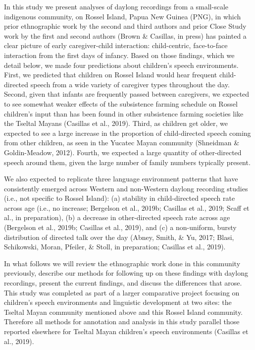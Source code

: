 \documentclass[,man,floatsintext]{apa6}
\begin{document}
In this study we present analyses of daylong recordings from a
small-scale indigenous community, on Rossel Island, Papua New Guinea
(PNG), in which prior ethnographic work by the second and third authors
and prior Close Study work by the first and second authors (Brown \&
Casillas, in press) has painted a clear picture of early caregiver-child
interaction: child-centric, face-to-face interaction from the first days
of infancy. Based on those findings, which we detail below, we made four
predictions about children's speech environments. First, we predicted
that children on Rossel Island would hear frequent child-directed speech
from a wide variety of caregiver types throughout the day. Second, given
that infants are frequently passed between caregivers, we expected to
see somewhat weaker effects of the subsistence farming schedule on
Rossel children's input than has been found in other subsistence farming
societies like the Tseltal Mayans (Casillas et al., 2019). Third, as
children get older, we expected to see a large increase in the
proportion of child-directed speech coming from other children, as seen
in the Yucatec Mayan community (Shneidman \& Goldin-Meadow, 2012).
Fourth, we expected a large quantity of other-directed speech around
them, given the large number of family numbers typically present.

We also expected to replicate three language environment patterns that
have consistently emerged across Western and non-Western daylong
recording studies (i.e., not specific to Rossel Island): (a) stability
in child-directed speech rate across age (i.e., no increase; Bergelson
et al., 2019b; Casillas et al., 2019; Scaff et al., in preparation), (b)
a decrease in other-directed speech rate across age (Bergelson et al.,
2019b; Casillas et al., 2019), and (c) a non-uniform, bursty
distribution of directed talk over the day (Abney, Smith, \& Yu, 2017;
Blasi, Schikowski, Moran, Pfeiler, \& Stoll, in preparation; Casillas et
al., 2019).

In what follows we will review the ethnographic work done in this
community previously, describe our methods for following up on these
findings with daylong recordings, present the current findings, and
discuss the differences that arose. This study was completed as part of
a larger comparative project focusing on children's speech environments
and linguistic development at two sites: the Tseltal Mayan community
mentioned above and this Rossel Island community. Therefore all methods
for annotation and analysis in this study parallel those reported
elsewhere for Tseltal Mayan children's speech environments (Casillas et
al., 2019).
\end{document}

